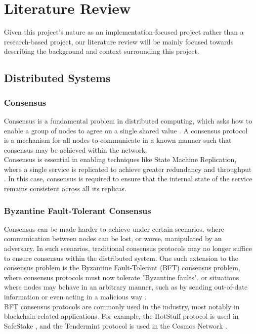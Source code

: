 \chapter{Literature Review}
\label{ch:lit_rev} 

Given this project's nature as an implementation-focused project rather than a research-based project, our literature review will be mainly focused towards describing the background and context surrounding this project.

\section{Distributed Systems} 
\subsection{Consensus}
Consensus is a fundamental problem in distributed computing, which asks how to enable a group of nodes to agree on a single shared value \cite{dsbook}. A consensus protocol is a mechanism for all nodes to communicate in a known manner such that consensus may be achieved within the network.
\\

Consensus is essential in enabling techniques like State Machine Replication, where a single service is replicated to achieve greater redundancy and throughput \cite{smr}. In this case, consensus is required to ensure that the internal state of the service remains consistent across all its replicas. 
\\

\subsection{Byzantine Fault-Tolerant Consensus}
Consensus can be made harder to achieve under certain scenarios, where communication between nodes can be lost, or worse, manipulated by an adversary. In such scenarios, traditional consensus protocols may no longer suffice to ensure consensus within the distributed system. One such extension to the consensus problem is the Byzantine Fault-Tolerant (BFT) consensus problem, where consensus protocols must now tolerate "Byzantine faults", or situations where nodes may behave in an arbitrary manner, such as by sending out-of-date information or even acting in a malicious way \cite{bgp-lamport}.
\\

BFT consensus protocols are commonly used in the industry, most notably in blockchain-related applications. For example, the HotStuff protocol is used in SafeStake \cite{safestake}, and the Tendermint protocol is used in the Cosmos Network \cite{cosmos}.
~\\

